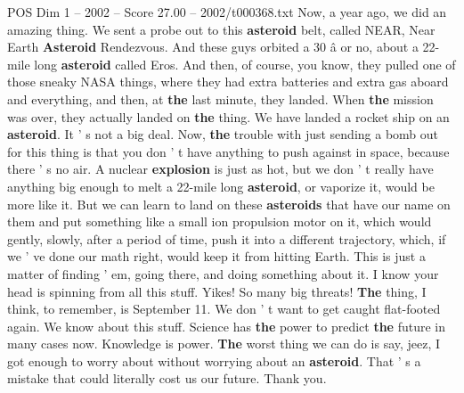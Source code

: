 \begin{textsample}{POS Dim 1 – 2002 – Score 27.00 – 2002/t000368.txt}
Now, a year ago, we did an amazing thing.
We sent a probe out to this \textbf{asteroid} belt, called NEAR, Near Earth \textbf{Asteroid} Rendezvous.
And these guys orbited a 30 â or no, about a 22-mile long \textbf{asteroid} called Eros.
And then, of course, you know, they pulled one of those sneaky NASA things, where they had extra batteries and extra gas aboard and everything, and then, at \textbf{the} last minute, they landed.
When \textbf{the} mission was over, they actually landed on \textbf{the} thing.
We have landed a rocket ship on an \textbf{asteroid}.
It ' s not a big deal.
Now, \textbf{the} trouble with just sending a bomb out for this thing is that you don ' t have anything to push against in space, because there ' s no air.
A nuclear \textbf{explosion} is just as hot, but we don ' t really have anything big enough to melt a 22-mile long \textbf{asteroid}, or vaporize it, would be more like it.
But we can learn to land on these \textbf{asteroids} that have our name on them and put something like a small ion propulsion motor on it, which would gently, slowly, after a period of time, push it into a different trajectory, which, if we ' ve done our math right, would keep it from hitting Earth.
This is just a matter of finding ' em, going there, and doing something about it.
I know your head is spinning from all this stuff.
Yikes!
So many big threats! \textbf{The} thing, I think, to remember, is September 11.
We don ' t want to get caught flat-footed again.
We know about this stuff.
Science has \textbf{the} power to predict \textbf{the} future in many cases now.
Knowledge is power. \textbf{The} worst thing we can do is say, jeez, I got enough to worry about without worrying about an \textbf{asteroid}.
That ' s a mistake that could literally cost us our future.
Thank you.

\end{textsample}
